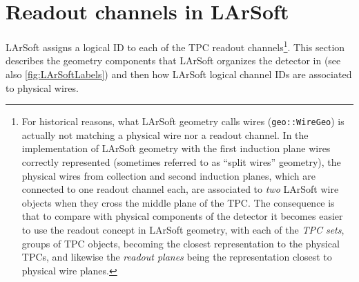 \section{Readout channels in LArSoft}
\label{sec:LArSoft}


LArSoft assigns a logical ID to each of the TPC readout channels\footnote{
For historical reasons, what LArSoft geometry calls wires
(\texttt{geo::WireGeo}) is actually not matching a physical wire nor a readout
channel. In the implementation of LArSoft geometry with the first induction
plane wires correctly represented
(sometimes referred to as ``split wires'' geometry),
the physical wires from collection and
second induction planes, which are connected to one readout channel each,
are associated to \emph{two} LArSoft wire objects when they cross the middle
plane of the TPC.
The consequence is that to compare with physical components of the detector
it becomes easier to use the readout concept in LArSoft geometry,
with each of the \emph{TPC sets}, groups of TPC objects, becoming the closest
representation to the physical TPCs, and likewise the \emph{readout planes} being
the representation closest to physical wire planes.}.
This section describes the geometry components that LArSoft organizes the detector in
(see also \cref{fig:LArSoftLabels})
and then how LArSoft logical channel IDs are associated to physical wires.
